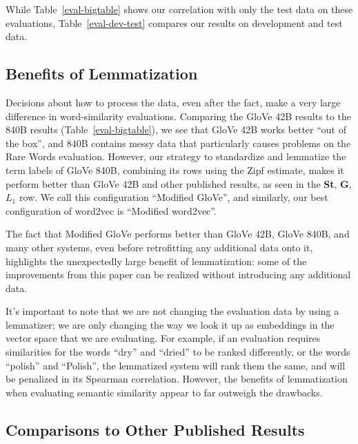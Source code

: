 \documentclass[11pt,letterpaper]{article}
\begin{document}
While Table~\ref{eval-bigtable} shows our correlation with only the test data on
these evaluations, Table~\ref{eval-dev-test} compares our results on
development and test data.

\subsection{Benefits of Lemmatization}

Decisions about how to process the data, even after
the fact, make a very large difference in word-similarity evaluations.
Comparing the GloVe 42B results to the 840B results (Table~\ref{eval-bigtable}), we see that GloVe 42B
works better ``out of the box'', and 840B contains messy data that particularly
causes problems on the Rare Words evaluation. However, our strategy to
standardize and lemmatize the term labels of GloVe 840B, combining its rows using
the Zipf estimate, makes it perform better than GloVe 42B and other published
results, as seen in the {\bf St}, {\bf G}, $L_1$ row. We call this
configuration ``Modified GloVe'',
and similarly, our best configuration of word2vec is ``Modified word2vec''.

The fact that Modified GloVe performs better than GloVe 42B, GloVe 840B, and many
other systems, even before retrofitting any additional data onto it, highlights
the unexpectedly large benefit of lemmatization: some of the improvements from
this paper can be realized without introducing any additional data.

It's important to note that we are not changing the evaluation data by using
a lemmatizer; we are only changing the way we look it up as embeddings in the
vector space that we are evaluating.
For example, if an evaluation requires
similarities for the words ``dry'' and ``dried'' to be ranked differently, or
the words ``polish'' and ``Polish'', the lemmatized system will rank them the
same, and will be penalized in its Spearman correlation.
However, the benefits of lemmatization when evaluating semantic similarity
appear to far outweigh the drawbacks.

\subsection{Comparisons to Other Published Results}
\end{document}
